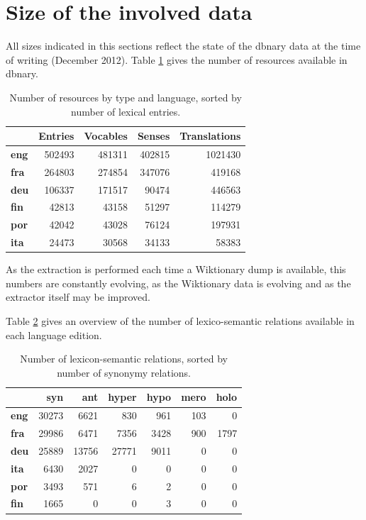 \documentclass[sw]{iosart2c}
\begin{document}
\section{Size of the involved data}

All sizes indicated in this sections reflect the state of the dbnary data at the time of writing (December 2012). Table \ref{globalsize} gives the number of resources available in dbnary.

\begin{table}[htb]
\begin{tabular}{lrrrr}
 & \textbf{Entries} & \textbf{Vocables} & \textbf{Senses} & \textbf{Translations}\\
 \hline
\textbf{eng} & 502493 & 481311 & 402815 & 1021430 \\
\textbf{fra} & 264803 & 274854 & 347076 & 419168 \\
\textbf{deu} & 106337 & 171517 & 90474 & 446563 \\
\textbf{fin} & 42813  & 43158 & 51297 & 114279 \\
\textbf{por} & 42042  & 43028 & 76124 & 197931 \\
\textbf{ita} & 24473  & 30568 & 34133 & 58383 \\
\end{tabular}
\caption{Number of resources by type and language, sorted by number of lexical entries.}\label{globalsize}
\end{table}

As the extraction is performed each time a Wiktionary dump is available, this numbers are constantly evolving, as the Wiktionary data is evolving and as the extractor itself may be improved.


Table \ref{nymsize} gives an overview of the number of lexico-semantic relations available in each language edition.

\begin{table}[htb]
\begin{tabular}{lrrrrrr}
 & \textbf{syn}  & \textbf{ant} & \textbf{hyper} & \textbf{hypo} & \textbf{mero} & \textbf{holo} \\
 \hline
\textbf{eng} & 30273& 6621& 830& 961& 103& 0 \\ 
\textbf{fra} & 29986& 6471& 7356& 3428& 900& 1797 \\ 
\textbf{deu} & 25889& 13756& 27771& 9011& 0& 0 \\ 
\textbf{ita} & 6430&  2027& 0& 0& 0& 0 \\ 
\textbf{por} & 3493&  571& 6& 2& 0& 0 \\ 
\textbf{fin} & 1665&  0& 0& 3& 0& 0 \\ 
\end{tabular}
\caption{Number of lexicon-semantic relations, sorted by number of synonymy relations.}\label{nymsize}
\end{table}
\end{document}
